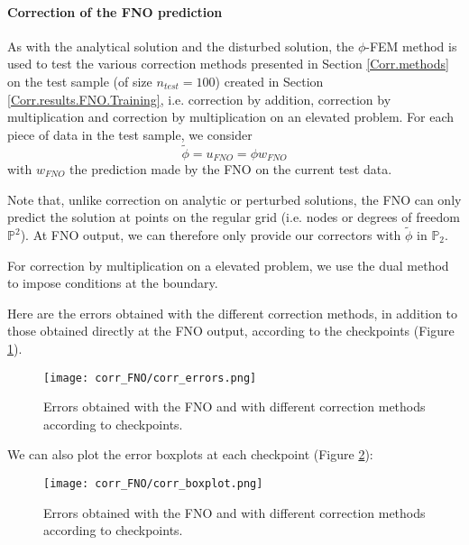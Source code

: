 \paragraph{Correction of the FNO prediction} \label{Corr.results.FNO.Corr}

As with the analytical solution and the disturbed solution, the $\phi$-FEM method is used to test the various correction methods presented in Section \ref{Corr.methods} on the test sample (of size $n_{test}=100$) created in Section \ref{Corr.results.FNO.Training}, i.e. correction by addition, correction by multiplication and correction by multiplication on an elevated problem. For each piece of data in the test sample, we consider  
\begin{equation*}
	\tilde{\phi}=u_{FNO}=\phi w_{FNO}
\end{equation*}
with $w_{FNO}$ the prediction made by the FNO on the current test data.

\begin{Rem}
	Note that, unlike correction on analytic or perturbed solutions, the FNO can only predict the solution at points on the regular grid (i.e. nodes or degrees of freedom $\mathbb{P}^2$). At FNO output, we can therefore only provide our correctors with $\tilde{\phi}$ in $\mathbb{P}_2$.
\end{Rem}

For correction by multiplication on a elevated problem, we use the dual method to impose conditions at the boundary.

Here are the errors obtained with the different correction methods, in addition to those obtained directly at the FNO output, according to the checkpoints (Figure \ref{corr_errors}).

\begin{figure}[H]
	\centering
	\texttt{[image: corr\_FNO/corr\_errors.png]}
	\caption{Errors obtained with the FNO and with different correction methods according to checkpoints.}
	\label{corr_errors}
\end{figure} 

\newpage

We can also plot the error boxplots at each checkpoint (Figure \ref{corr_boxplot}):

\begin{figure}[H]
	\centering
	\texttt{[image: corr\_FNO/corr\_boxplot.png]}
	\caption{Errors obtained with the FNO and with different correction methods according to checkpoints.}
	\label{corr_boxplot}
\end{figure} 

